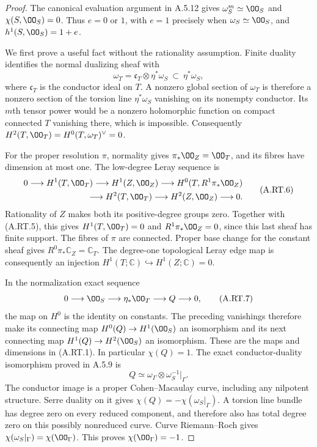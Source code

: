 \begin{proof}
The canonical evaluation argument in A.5.12 gives
$\omega_S^m\simeq\OO_S$ and $\chi(S,\OO_S)=0$.
Thus $e=0$ or $1$, with $e=1$ precisely when
$\omega_S\simeq\OO_S$, and
$h^1(S,\OO_S)=1+e$.

We first prove a useful fact without the rationality assumption.
Finite duality identifies the normal dualizing sheaf with
\[
 \omega_T=\mathfrak c_T\otimes\eta^*\omega_S
       \ \subset\ \eta^*\omega_S,
\tag{A.RT.5}
\]
where $\mathfrak c_T$ is the conductor ideal on $T$.
A nonzero global section of $\omega_T$ is therefore a nonzero
section of the torsion line $\eta^*\omega_S$ vanishing on its
nonempty conductor. Its $m$th tensor power would be a nonzero
holomorphic function on compact connected $T$ vanishing there,
which is impossible. Consequently
$H^2(T,\OO_T)=H^0(T,\omega_T)^\vee=0$.

For the proper resolution $\pi$, normality gives
$\pi_*\OO_Z=\OO_T$, and its fibres have dimension at most one.
The low-degree Leray sequence is
\[
\begin{split}
0\longrightarrow H^1(T,\OO_T)\longrightarrow H^1(Z,\OO_Z)
 \longrightarrow H^0(T,R^1\pi_*\OO_Z)\\
 \longrightarrow H^2(T,\OO_T)\longrightarrow H^2(Z,\OO_Z)
 \longrightarrow0.
\end{split}
\tag{A.RT.6}
\]
Rationality of $Z$ makes both its positive-degree groups zero.
Together with (A.RT.5), this gives $H^1(T,\OO_T)=0$ and
$R^1\pi_*\OO_Z=0$, since this last sheaf has finite support.
The fibres of $\pi$ are connected. Proper base change for the
constant sheaf gives $R^0\pi_*\mathbb C_Z=\mathbb C_T$.
The degree-one topological Leray edge map is consequently an
injection $H^1(T;\mathbb C)\hookrightarrow H^1(Z;\mathbb C)=0$.

In the normalization exact sequence
\[
 0\longrightarrow\OO_S\longrightarrow\eta_*\OO_T
       \longrightarrow Q\longrightarrow0,
\tag{A.RT.7}
\]
the map on $H^0$ is the identity on constants. The preceding
vanishings therefore make its connecting map
$H^0(Q)\to H^1(\OO_S)$ an isomorphism and its next connecting
map $H^1(Q)\to H^2(\OO_S)$ an isomorphism. These are the
maps and dimensions in (A.RT.1). In particular $\chi(Q)=1$.
The exact conductor-duality isomorphism proved in A.5.9 is
\[
 Q\simeq\omega_\Gamma\otimes\omega_S^{-1}|_\Gamma.
\tag{A.RT.8}
\]
The conductor image is a proper Cohen--Macaulay curve, including
any nilpotent structure. Serre duality on it gives
$\chi(Q)=-\chi(\omega_S|_\Gamma)$. A torsion line bundle has
degree zero on every reduced component, and therefore also has
total degree zero on this possibly nonreduced curve. Curve
Riemann--Roch gives
$\chi(\omega_S|_\Gamma)=\chi(\OO_\Gamma)$.
This proves $\chi(\OO_\Gamma)=-1$.


\end{proof}

